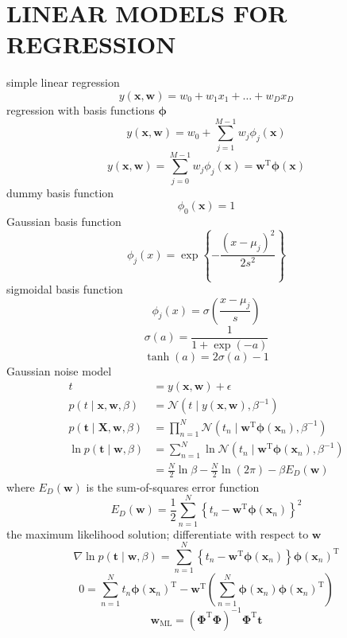 \documentclass{article}
\begin{document}
	\section{LINEAR MODELS FOR REGRESSION}
	simple linear regression
	$$
	y(\mathbf{x}, \mathbf{w})=w_{0}+w_{1} x_{1}+\ldots+w_{D} x_{D}
	$$
	regression with basis functions $\boldsymbol{\phi}$
	$$
	y(\mathbf{x}, \mathbf{w})=w_{0}+\sum_{j=1}^{M-1} w_{j} \phi_{j}(\mathbf{x})
	$$
	$$
	y(\mathbf{x}, \mathbf{w})=\sum_{j=0}^{M-1} w_{j} \phi_{j}(\mathbf{x})=\mathbf{w}^{\mathrm{T}} \boldsymbol{\phi}(\mathbf{x})
	$$
	dummy basis function
	$$
	\phi_{0}(\mathbf{x})=1
	$$
	Gaussian basis function
	$$
	\phi_{j}(x)=\exp \left\{-\frac{\left(x-\mu_{j}\right)^{2}}{2 s^{2}}\right\}
	$$
	sigmoidal basis function 
	$$
	\phi_{j}(x)=\sigma\left(\frac{x-\mu_{j}}{s}\right)
	$$
	$$
	\sigma(a)=\frac{1}{1+\exp (-a)}
	$$
	$$
	\tanh (a)=2 \sigma(a)-1
	$$
	Gaussian noise model
	$$
	\begin{aligned}
	t&=y(\mathbf{x}, \mathbf{w})+\epsilon \\
	p(t \mid \mathbf{x}, \mathbf{w}, \beta)&=\mathcal{N}\left(t \mid y(\mathbf{x}, \mathbf{w}), \beta^{-1}\right)\\
	p(\mathbf{t} \mid \mathbf{X}, \mathbf{w}, \beta)&=\prod_{n=1}^{N} \mathcal{N}\left(t_{n} \mid \mathbf{w}^{\mathrm{T}} \boldsymbol{\phi}\left(\mathbf{x}_{n}\right), \beta^{-1}\right)\\
	\ln p(\mathbf{t} \mid \mathbf{w}, \beta) &=\sum_{n=1}^{N} \ln \mathcal{N}\left(t_{n} \mid \mathbf{w}^{\mathrm{T}} \boldsymbol{\phi}\left(\mathbf{x}_{n}\right), \beta^{-1}\right) \\
	&=\frac{N}{2} \ln \beta-\frac{N}{2} \ln (2 \pi)-\beta E_{D}(\mathbf{w})
	\end{aligned}
	$$
	where $E_{D}(\mathbf{w})$ is the sum-of-squares error function
	$$
	E_{D}(\mathbf{w})=\frac{1}{2} \sum_{n=1}^{N}\left\{t_{n}-\mathbf{w}^{\mathrm{T}} \boldsymbol{\phi}\left(\mathbf{x}_{n}\right)\right\}^{2}
	$$
	the maximum likelihood solution; differentiate with respect to $\mathbf{w}$
	$$
	\nabla \ln p(\mathbf{t} \mid \mathbf{w}, \beta)=\sum_{n=1}^{N}\left\{t_{n}-\mathbf{w}^{\mathrm{T}} \boldsymbol{\phi}\left(\mathbf{x}_{n}\right)\right\} \boldsymbol{\phi}\left(\mathbf{x}_{n}\right)^{\mathrm{T}}
	$$
	$$
	0=\sum_{n=1}^{N} t_{n} \boldsymbol{\phi}\left(\mathbf{x}_{n}\right)^{\mathrm{T}}-\mathbf{w}^{\mathrm{T}}\left(\sum_{n=1}^{N} \boldsymbol{\phi}\left(\mathbf{x}_{n}\right) \boldsymbol{\phi}\left(\mathbf{x}_{n}\right)^{\mathrm{T}}\right)
	$$
	$$
	\mathbf{w}_{\mathrm{ML}}=\left(\boldsymbol{\Phi}^{\mathrm{T}} \boldsymbol{\Phi}\right)^{-1} \boldsymbol{\Phi}^{\mathrm{T}} \mathbf{t}
	$$
\end{document}
